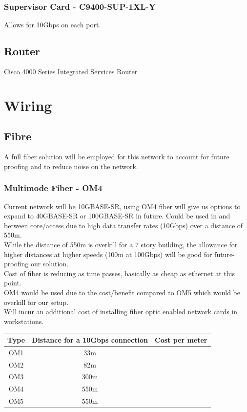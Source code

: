 \subsubsection{Supervisor Card - C9400-SUP-1XL-Y}
Allows for 10Gbps on each port.
\subsection{Router}
Cisco 4000 Series Integrated Services Router
\section{Wiring}
\subsection{Fibre}
A full fiber solution will be employed for this network to account for future proofing and to reduce noise on the network.
\subsubsection{Multimode Fiber - OM4}
Current network will be 10GBASE-SR, using OM4 fiber will give us options to expand to 40GBASE-SR or 100GBASE-SR in future.
Could be used in and between core/access due to high data transfer rates (10Gbps) over a distance of 550m.\\
While the distance of 550m is overkill for a 7 story building, the allowance for higher distances at higher speeds (100m at 100Gbps) will be good for future-proofing our solution.\\
Cost of fiber is reducing as time passes, basically as cheap as ethernet at this point.\\
OM4 would be used due to the cost/benefit compared to OM5 which would be overkill for our setup.\\
Will incur an additional cost of installing fiber optic enabled network cards in workstations.\\

\begin{table}[ht!]
    \centering
    \begin{tabular}{|c|c|c|}
    \hline
    Type & Distance for a 10Gbps connection & Cost per meter \\ \hline
    OM1  & 33m                              &                \\ \hline
    OM2  & 82m                              &                \\ \hline
    OM3  & 300m                             &                \\ \hline
    OM4  & 550m                             &                \\ \hline
    OM5  & 550m                             &                \\ \hline
    \end{tabular}
\end{table}

